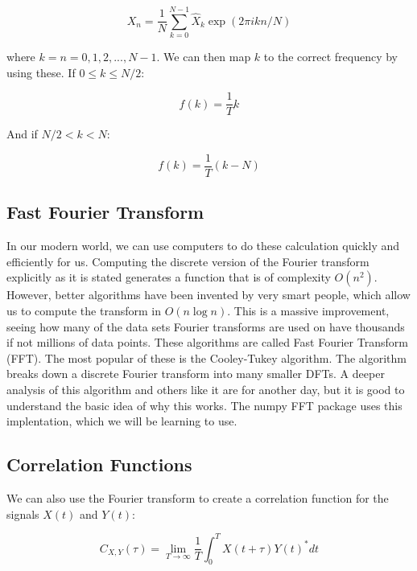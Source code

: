 \documentclass[12pt]{article}
\begin{document}
\begin{equation}
X_n = \frac{1}{N} \sum_{k=0}^{N-1} \hat{X}_k \exp{\left( 2 \pi i k n / N \right)}
\end{equation}

where $k = n = 0, 1, 2, ... , N-1$. We can then map $k$ to the correct frequency by using these. If $0 \leq k \leq N/2$:

\begin{equation}
f(k) = \frac{1}{T} k 
\end{equation}

And if $ N/2 < k < N$:

\begin{equation}
f(k) = \frac{1}{T} (k - N)
\end{equation}




\subsection*{Fast Fourier Transform}

In our modern world, we can use computers to do these calculation quickly and efficiently for us. Computing the discrete version of the Fourier transform explicitly as it is stated generates a function that is of complexity $O(n^2)$. However, better algorithms have been invented by very smart people, which allow us to compute the transform in $O(n \log{n})$. This is a massive improvement, seeing how many of the data sets Fourier transforms are used on have thousands if not millions of data points. These algorithms are called Fast Fourier Transform (FFT). The most popular of these is the Cooley-Tukey algorithm. The algorithm breaks down a discrete Fourier transform into many smaller DFTs. A deeper analysis of this algorithm and others like it are for another day, but it is good to understand the basic idea of why this works. The numpy FFT package uses this implentation, which we will be learning to use.




\subsection*{Correlation Functions}

We can also use the Fourier transform to create a correlation function for the signals $X(t)$ and $Y(t)$:

\begin{equation}
C_{X,Y}(\tau) = \lim_{T \longrightarrow \infty} \frac{1}{T} \int_0^T X(t+\tau)Y(t)^* dt
\end{equation}
\end{document}
